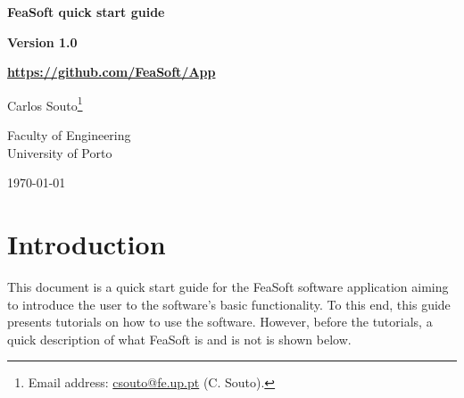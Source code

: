 \documentclass[
    11pt,        %
    a4paper,     %
    final,       %
    fleqn,       %
    notitlepage, %
    onecolumn,   %
    oneside,     %
]{article}
\begin{document}
\begin{center}
    \bfseries
    \huge
    FeaSoft quick start guide
\end{center}

\begin{center}
    \bfseries
    \large
    Version 1.0
\end{center}

\begin{center}
    \bfseries
    \large
    \url{https://github.com/FeaSoft/App}
\end{center}

\begin{center}
    \large
    Carlos Souto\footnote{Email address: \href{mailto:csouto@fe.up.pt}{csouto@fe.up.pt} (C. Souto).}

    \vspace{5pt}
    \normalsize
    Faculty of Engineering \\ University of Porto
\end{center}

\begin{center}
    \large
    \today
\end{center}

\tableofcontents

\section{Introduction}

This document is a quick start guide for the FeaSoft software application aiming to introduce the user to the software's basic functionality. To this end, this guide presents tutorials on how to use the software. However, before the tutorials, a quick description of what FeaSoft is and is not is shown below.
\end{document}
